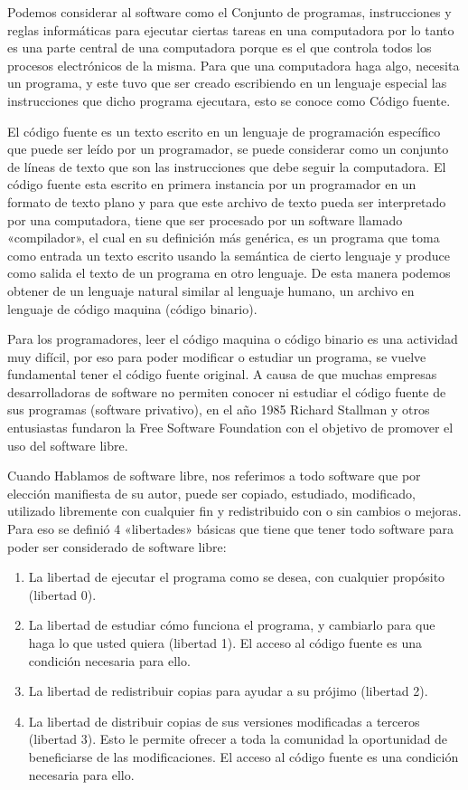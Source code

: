 \documentclass[letterpaper,10pt,english]{sphinxmanual}
\begin{document}
Podemos considerar al software como el Conjunto de programas,
instrucciones y reglas informáticas para ejecutar ciertas tareas en una
computadora por lo tanto es una parte central de una computadora
porque es el que controla todos los procesos electrónicos de la
misma. Para que una computadora haga algo, necesita un programa, y
este tuvo que ser creado escribiendo en un lenguaje especial las
instrucciones que dicho programa ejecutara, esto se conoce como
Código fuente.

El código fuente es un texto escrito en un lenguaje de programación
específico que puede ser leído por un programador, se puede considerar
como un conjunto de líneas de texto que son las instrucciones que
debe seguir la computadora. El código fuente esta escrito en primera
instancia por un programador en un formato de texto plano y para que
este archivo de texto pueda ser interpretado por una computadora,
tiene que ser procesado por un software llamado «compilador», el cual
en su definición más genérica, es un programa que toma como entrada un
texto escrito usando la semántica de cierto lenguaje y produce como
salida el texto de un programa en otro lenguaje. De esta manera podemos
obtener de un lenguaje natural similar al lenguaje humano, un archivo
en lenguaje de código maquina (código binario).

Para los programadores, leer el código maquina o código binario es una
actividad muy difícil, por eso para poder modificar o estudiar un
programa, se vuelve fundamental tener el código fuente original. A
causa de que muchas empresas desarrolladoras de software no permiten
conocer ni estudiar el código fuente de sus programas
(software privativo), en el año 1985 Richard Stallman y otros
entusiastas fundaron la Free Software Foundation con el objetivo de
promover el uso del software libre.

Cuando Hablamos de software libre, nos referimos a todo software que
por elección manifiesta de su autor, puede ser copiado,
estudiado, modificado, utilizado libremente con cualquier fin y
redistribuido con o sin cambios o mejoras. Para eso se definió 4
«libertades» básicas que tiene que tener todo software para poder ser
considerado de software libre:
\begin{enumerate}
\item {} 
La libertad de ejecutar el programa como se desea, con cualquier propósito (libertad 0).

\item {} 
La libertad de estudiar cómo funciona el programa, y cambiarlo para que haga lo que usted quiera (libertad 1). El acceso al código fuente es una condición necesaria para ello.

\item {} 
La libertad de redistribuir copias para ayudar a su prójimo (libertad 2).

\item {} 
La libertad de distribuir copias de sus versiones modificadas a terceros (libertad 3). Esto le permite ofrecer a toda la comunidad la oportunidad de beneficiarse de las modificaciones. El acceso al código fuente es una condición necesaria para ello.

\end{enumerate}
\end{document}
